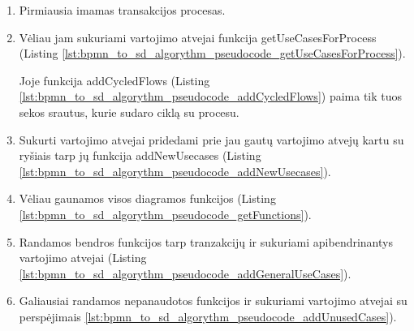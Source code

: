 \documentclass{VUMIFInfBakalaurinis}
\begin{document}
\begin{enumerate}
	\item Pirmiausia imamas transakcijos procesas. 
	\item Vėliau jam sukuriami vartojimo atvejai funkcija getUseCasesForProcess (Listing  \ref{lst:bpmn_to_sd_algorythm_pseudocode_getUseCasesForProcess}).
	
	Joje funkcija addCycledFlows (Listing  \ref{lst:bpmn_to_sd_algorythm_pseudocode_addCycledFlows}) paima tik tuos sekos srautus, kurie sudaro ciklą su procesu.
	
	
	\item Sukurti vartojimo atvejai pridedami prie jau gautų vartojimo atvejų kartu su ryšiais tarp jų funkcija addNewUsecases (Listing  \ref{lst:bpmn_to_sd_algorythm_pseudocode_addNewUsecases}). 
	

	\item Vėliau gaunamos visos diagramos funkcijos (Listing  \ref{lst:bpmn_to_sd_algorythm_pseudocode_getFunctions}).
	
	\item Randamos bendros funkcijos tarp tranzakcijų ir sukuriami apibendrinantys vartojimo atvejai (Listing  \ref{lst:bpmn_to_sd_algorythm_pseudocode_addGeneralUseCases}).
	
	\item Galiausiai randamos nepanaudotos funkcijos ir sukuriami vartojimo atvejai su perspėjimais \ref{lst:bpmn_to_sd_algorythm_pseudocode_addUnusedCases}).
	
\end{enumerate} 


\end{document}
